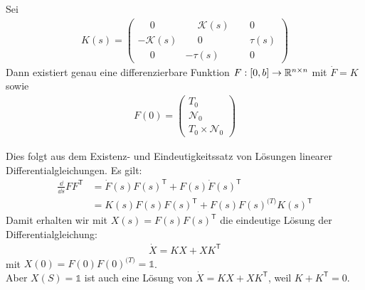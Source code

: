\begin{bew}
Sei 
\begin{align}
K(s)= \begin{pmatrix}	
	\phantom{-}0 & \phantom{-}\mathcal{K}(s) & \phantom{-}0 \\
	-\mathcal{K}(s) & \phantom{-}0 & \phantom{-}\tau(s) \\
	\phantom{-}0 & -\tau(s) & \phantom{-}0
	\end{pmatrix}\tag{$\star$}	
\end{align}
Dann existiert genau eine differenzierbare Funktion $F: [0,b]\rightarrow \mathbb{R}^{n \times n}$ mit $\dot{F} = K$ sowie
\begin{align*}
F(0)=\begin{pmatrix}
	T_0 \\ \mathcal{N}_0 \\ T_0 \times \mathcal{N}_0 \end{pmatrix}
\end{align*}

Dies folgt aus dem Existenz- und Eindeutigkeitssatz von Lösungen linearer Differentialgleichungen. Es gilt:
\begin{align*}
	\frac{\dd}{\dd s} F F^{\mathsf{T}} &= \dot{F}(s) F(s)^{\mathsf{T}} + F(s) \dot{F}(s)^{\mathsf{T}}\\
	&= K(s)F(s)F(s)^{\mathsf{T}} + F(s)F(s)^{\mathsf(T)}K(s)^{\mathsf{T}} 
\end{align*}
Damit erhalten wir mit $X(s) = F(s)F(s)^{\mathsf{T}} $ die eindeutige Lösung der Differentialgleichung:
\begin{align*}
	\dot{X} = KX + XK^{\mathsf{T}}
\end{align*}
mit $X(0) = F(0)F(0)^{\mathsf(T)} = \mathds{1}$. \\

Aber $X(S) = \mathds{1}$ ist auch eine Lösung von $\dot{X} = KX + XK^{\mathsf{T}}$, weil $K + K^{\mathsf{T}} = 0$. \\


\end{bew}
